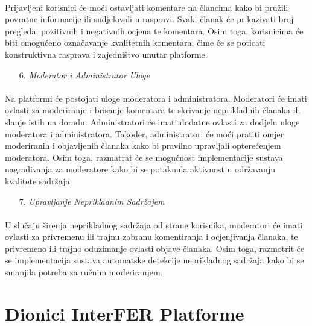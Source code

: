 \paragraph{}
Prijavljeni korisnici će moći ostavljati komentare na člancima kako bi pružili povratne informacije ili sudjelovali u raspravi. Svaki članak će prikazivati broj pregleda, pozitivnih i negativnih ocjena te komentara. Osim toga, korisnicima će biti omogućeno označavanje kvalitetnih komentara, čime će se poticati konstruktivna rasprava i zajedništvo unutar platforme.

\begin{enumerate}
	\item[6.] \textit{Moderator i Administrator Uloge}
\end{enumerate}

\paragraph{}
Na platformi će postojati uloge moderatora i administratora. Moderatori će imati ovlasti za moderiranje i brisanje komentara te skrivanje neprikladnih članaka ili slanje istih na doradu. Administratori će imati dodatne ovlasti za dodjelu uloge moderatora i administratora. Također, administratori će moći pratiti omjer moderiranih i objavljenih članaka kako bi pravilno upravljali opterećenjem moderatora. Osim toga, razmatrat će se mogućnost implementacije sustava nagrađivanja za moderatore kako bi se potaknula aktivnost u održavanju kvalitete sadržaja.

\begin{enumerate}
	\item[7.] \textit{Upravljanje Neprikladnim Sadržajem}
\end{enumerate}

\paragraph{}
U slučaju širenja neprikladnog sadržaja od strane korisnika, moderatori će imati ovlasti za privremenu ili trajnu zabranu komentiranja i ocjenjivanja članaka, te privremeno ili trajno oduzimanje ovlasti objave članaka. Osim toga, razmotrit će se implementacija sustava automatske detekcije neprikladnog sadržaja kako bi se smanjila potreba za ručnim moderiranjem.

\section{Dionici InterFER Platforme}

